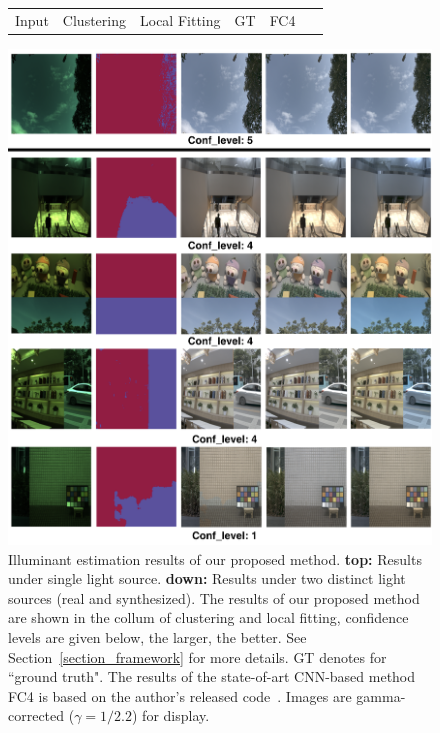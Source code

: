 \documentclass[10pt,twocolumn,letterpaper]{article}
\begin{document}
\begin{figure}[t]
\begin{center}
\footnotesize
\begin{tabular}{cccccc}
\hspace{0.3cm} Input & \hspace{0.15cm} Clustering & Local Fitting & \hspace{0.25cm} GT & \hspace{0.45cm} FC4~\cite{hu2017fc} \\
\end{tabular}
\includegraphics[width=\linewidth]{../Images/show_off.png}
\end{center}
   \caption{Illuminant estimation results of our proposed method.
            \textbf{top:} Results under single light source.
            \textbf{down:} Results under two distinct light sources (real and synthesized).
            The results of our proposed method are shown in the collum of clustering and local fitting,
            confidence levels are given below, the larger, the better.
            See Section~\ref{section_framework} for more details.
            GT denotes for ``ground truth".
            The results of the state-of-art CNN-based method FC4 is based on
            \setcounter{footnote}{0}
            the author's released code~\protect\footnotemark.
            Images are gamma-corrected ($\gamma = 1/2.2$) for display.}
\label{fig:show_off}
\end{figure}
\end{document}
